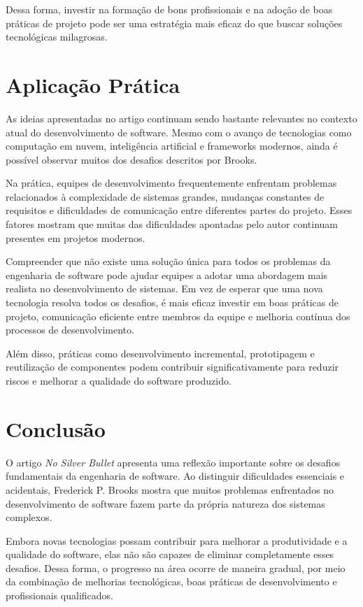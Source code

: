 \documentclass[conference]{IEEEtran}
\begin{document}
Dessa forma, investir na formação de bons profissionais e na adoção de boas práticas de projeto pode ser uma estratégia mais eficaz do que buscar soluções tecnológicas milagrosas.

\section{Aplicação Prática}

As ideias apresentadas no artigo continuam sendo bastante relevantes no contexto atual do desenvolvimento de software. Mesmo com o avanço de tecnologias como computação em nuvem, inteligência artificial e frameworks modernos, ainda é possível observar muitos dos desafios descritos por Brooks.

Na prática, equipes de desenvolvimento frequentemente enfrentam problemas relacionados à complexidade de sistemas grandes, mudanças constantes de requisitos e dificuldades de comunicação entre diferentes partes do projeto. Esses fatores mostram que muitas das dificuldades apontadas pelo autor continuam presentes em projetos modernos.

Compreender que não existe uma solução única para todos os problemas da engenharia de software pode ajudar equipes a adotar uma abordagem mais realista no desenvolvimento de sistemas. Em vez de esperar que uma nova tecnologia resolva todos os desafios, é mais eficaz investir em boas práticas de projeto, comunicação eficiente entre membros da equipe e melhoria contínua dos processos de desenvolvimento.

Além disso, práticas como desenvolvimento incremental, prototipagem e reutilização de componentes podem contribuir significativamente para reduzir riscos e melhorar a qualidade do software produzido.

\section{Conclusão}

O artigo \textit{No Silver Bullet} apresenta uma reflexão importante sobre os desafios fundamentais da engenharia de software. Ao distinguir dificuldades essenciais e acidentais, Frederick P. Brooks mostra que muitos problemas enfrentados no desenvolvimento de software fazem parte da própria natureza dos sistemas complexos.

Embora novas tecnologias possam contribuir para melhorar a produtividade e a qualidade do software, elas não são capazes de eliminar completamente esses desafios. Dessa forma, o progresso na área ocorre de maneira gradual, por meio da combinação de melhorias tecnológicas, boas práticas de desenvolvimento e profissionais qualificados.
\end{document}
